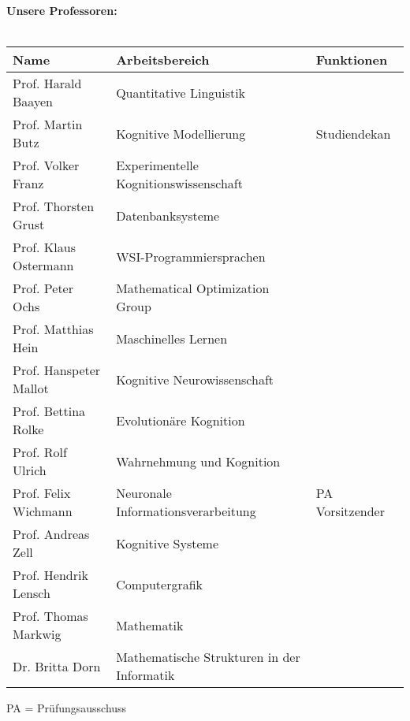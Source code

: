 \renewcommand{\arraystretch}{1}
\normalsize 
\textbf{Unsere Professoren:}\\\\
\footnotesize

\begin{tabular}{|p{}p{}p{}|}
\hline
Name                          & Arbeitsbereich & Funktionen \\
\hline
\hline
Prof. Harald Baayen			& Quantitative Linguistik 				& \\
Prof. Martin Butz           & Kognitive Modellierung 				& Studiendekan	\\
Prof. Volker Franz			& Experimentelle Kognitionswissenschaft	& \\
Prof. Thorsten Grust		& Datenbanksysteme & \\
Prof. Klaus Ostermann & WSI-Programmiersprachen & \\
Prof. Peter Ochs & Mathematical Optimization Group & \\
Prof. Matthias Hein			& Maschinelles Lernen & \\
Prof. Hanspeter Mallot 		& Kognitive Neurowissenschaft	& \\
Prof. Bettina Rolke			& Evolutionäre Kognition	& \\
Prof. Rolf Ulrich			& Wahrnehmung und Kognition	& \\
Prof. Felix Wichmann        & Neuronale Informationsverarbeitung	& PA Vorsitzender\\
Prof. Andreas Zell          & Kognitive Systeme 		 &\\
Prof. Hendrik Lensch & Computergrafik &\\
Prof. Thomas Markwig & Mathematik &\\
Dr. Britta Dorn & Mathematische Strukturen in der Informatik &\\
\hline
\end{tabular}

\scriptsize{PA = Prüfungsausschuss}

